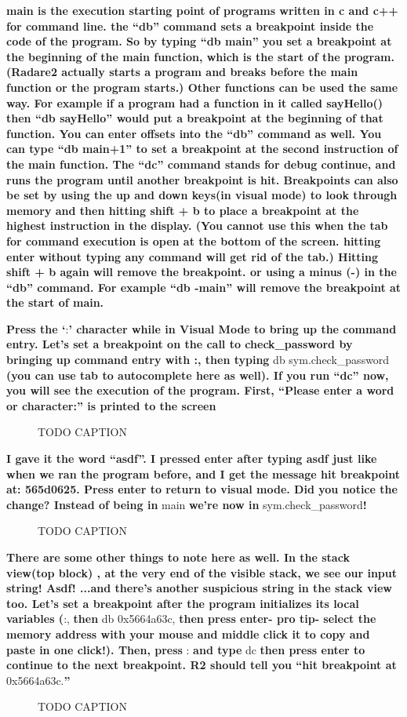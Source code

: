 \documentclass[letterpaper]{article}
\newcommand{\sitfig}[3]{
\begin{figure}[H]
\centering
\makebox[\textwidth][c]{
#2
}
\caption{#3}
\label{#1}
\end{figure}
}
\newcommand{\sitgfx}[4][scale=1.0]{
\sitfig{#3}{\texttt{[image: \#2]}}{#4}
}
\begin{document}
\textbf{main is the execution starting point of programs written in c and c++ for command line. the ``db'' command sets
a breakpoint inside the code of the program. So by typing ``db main'' you set a breakpoint at the beginning of the main
function, which is the start of the program. (Radare2 actually starts a program and breaks before the main function or
the program starts.) Other functions can be used the same way. For example if a program had a function in it called
sayHello() then ``db sayHello'' would put a breakpoint at the beginning of that function. You can enter offsets into
the ``db'' command as well. You can type ``db main+1'' to set a breakpoint at the second instruction of the main
function. The ``dc'' command stands for debug continue, and runs the program until another breakpoint is hit.
Breakpoints can also be set by using the up and down keys(in visual mode) to look through memory and then hitting shift
+ b to place a breakpoint at the highest instruction in the display. (You cannot use this when the tab for command
execution is open at the bottom of the screen. hitting enter without typing any command will get rid of the tab.)
Hitting shift + b again will remove the breakpoint. or using a minus (-) in the ``db'' command. For example ``db
-main'' will remove the breakpoint at the start of main.}

\textbf{Press the `}:\textbf{{}' character while in Visual Mode to bring up the command entry. Let's set a breakpoint on
the call to check\_password by bringing up command entry with :, then typing }db sym.check\_password \textbf{(you can
use tab to autocomplete here as well).  If you run ``dc'' now, you will see the execution of the program. First,
``Please enter a word or character:'' is printed to the screen}  
\sitgfx[width=6.5in,height=5.3335in]{FINALWORKINGDOCFORMERLYPRECURSOR-img030.png}{fig:unk}{TODO CAPTION}
 

\textbf{I gave it the word ``asdf''. I pressed enter after typing asdf just like when we ran the program before, and I
get the message hit breakpoint at: 565d0625. Press enter to return to visual mode. Did you notice the change? Instead
of being in }main\textbf{ we're now in }sym.check\_password\textbf{! }  
\sitgfx[width=6.5in,height=5.2083in]{FINALWORKINGDOCFORMERLYPRECURSOR-img031.png}{fig:unk}{TODO CAPTION}
 

\textbf{There are some other things to note here as well. In the stack view(top block) , at the very end of the visible
stack, we see our input string! Asdf! ...and there's another suspicious string in the stack view too. Let's set a
breakpoint after the program initializes its local variables (}:, \textbf{then }db 0x5664a63c, \textbf{then press
enter- pro tip- select the memory address with your mouse and middle click it to copy and paste in one click!). Then,
press }: \textbf{and type }dc \textbf{then press enter to continue to the next breakpoint. R2 should tell you ``hit
breakpoint at }0x5664a63c.\textbf{{}'' }  
\sitgfx[width=6.5in,height=5in]{FINALWORKINGDOCFORMERLYPRECURSOR-img032.png}{fig:unk}{TODO CAPTION}
 
\end{document}
